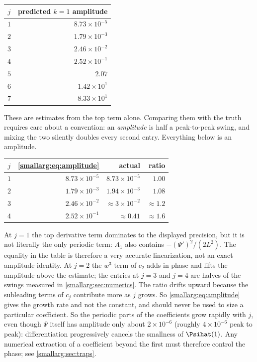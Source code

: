 \documentclass[11pt,oneside]{article}
\theoremstyle{definition}
\theoremstyle{remark}
\begin{document}
\begin{center}
\begin{tabular}{@{}cr@{}}
\toprule
$j$ & predicted $k=1$ amplitude\\
\midrule
$1$ & $8.73\times10^{-5}$\\
$2$ & $1.79\times10^{-3}$\\
$3$ & $2.46\times10^{-2}$\\
$4$ & $2.52\times10^{-1}$\\
$5$ & $2.07$\\
$6$ & $1.42\times10^{1}$\\
$7$ & $8.33\times10^{1}$\\
\bottomrule
\end{tabular}
\end{center}

These are estimates from the top term alone.  Comparing them with the truth
requires care about a convention: an \emph{amplitude} is half a
peak-to-peak swing, and mixing the two silently doubles every second
entry.  Everything below is an amplitude.

\begin{center}
\begin{tabular}{@{}crrr@{}}
\toprule
$j$ & \cref{smallarg:eq:amplitude} & actual & ratio\\
\midrule
$1$ & $8.73\times10^{-5}$ & $8.73\times10^{-5}$ & $1.00$\\
$2$ & $1.79\times10^{-3}$ & $1.94\times10^{-3}$ & $1.08$\\
$3$ & $2.46\times10^{-2}$ & $\approx3\times10^{-2}$ & $\approx1.2$\\
$4$ & $2.52\times10^{-1}$ & $\approx0.41$ & $\approx1.6$\\
\bottomrule
\end{tabular}
\end{center}

At $j=1$ the top derivative term dominates to the displayed precision, but it is not literally the only periodic term: $A_1$ also contains $-(\Psi')^2/(2L^2)$.  The equality in the table is therefore a very accurate linearization, not an exact amplitude identity.  At
$j=2$ the $w^3$ term of $c_2$ adds in phase and lifts the amplitude above
the estimate; the entries at $j=3$ and $j=4$ are halves of the swings
measured in \cref{smallarg:sec:numerics}.  The ratio drifts upward because the
subleading terms of $c_j$ contribute more as $j$ grows.  So
\cref{smallarg:eq:amplitude} gives the growth rate and not the constant, and should
never be used to size a particular coefficient.  So the periodic parts of
the coefficients grow rapidly with $j$, even though \(\Psi\) itself has
amplitude only about \(2\times10^{-6}\) (roughly \(4\times10^{-6}\) peak to
peak): differentiation progressively cancels the smallness of
$\Psihat(1)$.  Any numerical extraction of a coefficient beyond the first must
therefore control the phase; see \cref{smallarg:sec:traps}.
\end{document}
